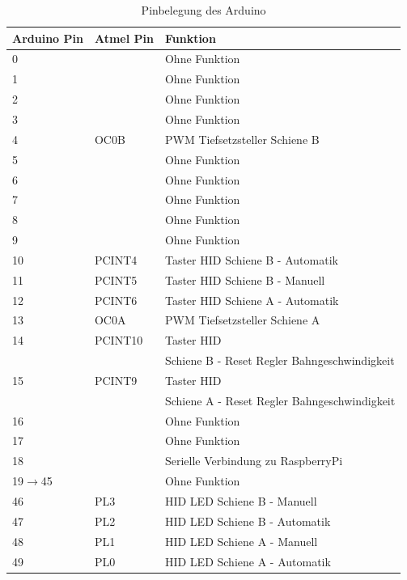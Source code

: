 \documentclass[a4paper, 11pt]{report}
\begin{document}
	\begin{table}[hb]
		\caption{Pinbelegung des Arduino}
		\begin{tabular}{|l|l|l|}
			\hline
			\textbf{Arduino Pin} & \textbf{Atmel Pin} &\textbf{Funktion}\\
			\hline
			\hline
			0 &  & Ohne Funktion\\
			\hline
			1 &  & Ohne Funktion\\
			\hline
			2 &  & Ohne Funktion\\
			\hline
			3 &  & Ohne Funktion\\
			\hline
			4 & OC0B & PWM Tiefsetzsteller Schiene B\\
			\hline
			5 &  & Ohne Funktion\\
			\hline
			6 &  & Ohne Funktion\\
			\hline
			7 &  & Ohne Funktion\\
			\hline
			8 &  & Ohne Funktion\\
			\hline
			9 &  & Ohne Funktion\\
			\hline
			10 & PCINT4 & Taster HID \glqq Schiene B - Automatik\grqq \\
			\hline
			11 & PCINT5 & Taster HID \glqq Schiene B - Manuell\grqq \\
			\hline
			12 & PCINT6 & Taster HID \glqq Schiene A - Automatik\grqq \\
			\hline
			13 &  OC0A & PWM Tiefsetzsteller Schiene A\\
			\hline
			14	& PCINT10	& Taster HID \\
				&		& \glqq Schiene B - Reset Regler Bahngeschwindigkeit\grqq \\
			\hline
			15 	& PCINT9 	& Taster HID \\
				&		& \glqq Schiene A - Reset Regler Bahngeschwindigkeit\grqq \\
			\hline
			16 &  & Ohne Funktion\\
			\hline
			17 &  & Ohne Funktion\\
			\hline
			18 &  & Serielle Verbindung zu RaspberryPi\\
			\hline
			19$\rightarrow$45 &  & Ohne Funktion\\
			\hline
			46 & PL3 & HID LED \glqq Schiene B - Manuell\\
			\hline
			47 & PL2 & HID LED \glqq Schiene B - Automatik\\
			\hline
			48 & PL1 & HID LED \glqq Schiene A - Manuell\\
			\hline
			49 & PL0 & HID LED \glqq Schiene A - Automatik\\

\end{tabular}
\end{table}
\end{document}
